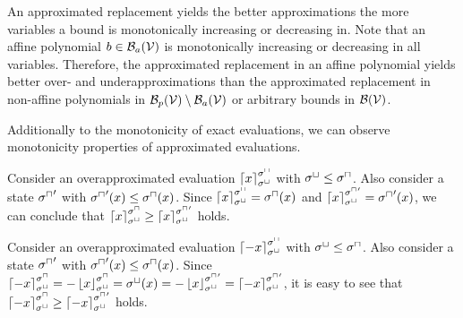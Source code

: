 An approximated replacement yields the better approximations the more variables a bound is monotonically increasing or decreasing in.
Note that an affine polynomial $b \in \mathcal{B}_a(\mathcal{V})$ is monotonically increasing or decreasing in all variables.
Therefore, the approximated replacement in an affine polynomial yields better over- and underapproximations than the approximated replacement in non-affine polynomials in $\mathcal{B}_p(\mathcal{V}) \setminus \mathcal{B}_a(\mathcal{V})$ or arbitrary bounds in $\mathcal{B}(\mathcal{V})$.

Additionally to the monotonicity of exact evaluations, we can observe monotonicity properties of approximated evaluations.



\begin{example}
  Consider an overapproximated evaluation $\left\lceil x \right\rceil^{{\sigma^\sqcap}}_{{\sigma^\sqcup}}$ with ${\sigma^\sqcup} \leq {\sigma^\sqcap}$.
  Also consider a state ${\sigma^\sqcap}'$ with ${\sigma^\sqcap}'(x) \leq {\sigma^\sqcap}(x)$.
  Since $\left\lceil x \right\rceil^{{\sigma^\sqcap}}_{{\sigma^\sqcup}} = {\sigma^\sqcap}(x)$ and $\left\lceil x \right\rceil^{{\sigma^\sqcap}'}_{{\sigma^\sqcup}} = {\sigma^\sqcap}'(x)$, we can conclude that $\left\lceil x \right\rceil^{{\sigma^\sqcap}}_{{\sigma^\sqcup}} \geq \left\lceil x \right\rceil^{{\sigma^\sqcap}'}_{{\sigma^\sqcup}}$ holds.

  Consider an overapproximated evaluation $\left\lceil -x \right\rceil^{{\sigma^\sqcap}}_{{\sigma^\sqcup}}$ with ${\sigma^\sqcup} \leq {\sigma^\sqcap}$.
  Also consider a state ${\sigma^\sqcap}'$ with ${\sigma^\sqcap}'(x) \leq {\sigma^\sqcap}(x)$.
  Since $\left\lceil -x \right\rceil^{{\sigma^\sqcap}}_{{\sigma^\sqcup}} = -\left\lfloor x \right\rfloor^{{\sigma^\sqcap}}_{{\sigma^\sqcup}} = {\sigma^\sqcup}(x) = -\left\lfloor x \right\rfloor^{{\sigma^\sqcap}'}_{{\sigma^\sqcup}} = \left\lceil -x \right\rceil^{{\sigma^\sqcap}'}_{{\sigma^\sqcup}}$, it is easy to see that $\left\lceil -x \right\rceil^{{\sigma^\sqcap}}_{{\sigma^\sqcup}} \geq \left\lceil -x \right\rceil^{{\sigma^\sqcap}'}_{{\sigma^\sqcup}}$ holds.
\end{example}
